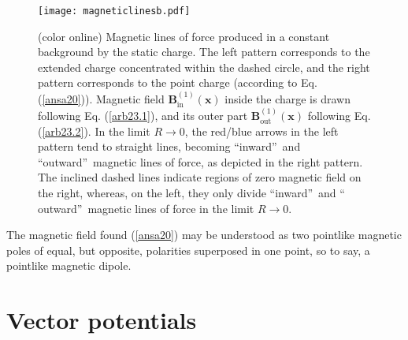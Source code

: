 \documentclass[12pt]{article}
\begin{document}
\begin{figure}[th]
\begin{center}
\texttt{[image: magneticlinesb.pdf]}
\end{center}
\caption{(color online) Magnetic lines of force produced in a constant
background by the static charge. The left pattern corresponds to the
extended charge concentrated within the dashed circle, and the right pattern
corresponds to the point charge (according to Eq. (\protect\ref{ansa20})).
Magnetic field $\mathbf{B}_{\mathrm{in}}^{\left( 1\right) }\left( \mathbf{x}%
\right) $ inside the charge is drawn following Eq. (\protect\ref{arb23.1}),
and its outer part $\mathbf{B}_{\mathrm{out}}^{\left( 1\right) }\left( 
\mathbf{x}\right) $ following Eq. (\protect\ref{arb23.2}). In the limit $%
R\rightarrow 0$, the red/blue arrows in the left pattern tend to straight
lines, becoming \textquotedblleft inward\textquotedblright\ and
\textquotedblleft outward\textquotedblright\ magnetic lines of force, as
depicted in the right pattern. The inclined dashed lines indicate regions of
zero magnetic field on the right, whereas, on the left, they only divide
\textquotedblleft inward\textquotedblright\ and \textquotedblleft
outward\textquotedblright\ magnetic lines of force in the limit $%
R\rightarrow 0$.}
\label{Fig2}
\end{figure}
The magnetic field found (\ref{ansa20}) may be understood as two pointlike
magnetic poles of equal, but opposite, polarities superposed in one point,
so to say, a pointlike magnetic dipole.

\section{Vector potentials\label{S4}}
\end{document}
